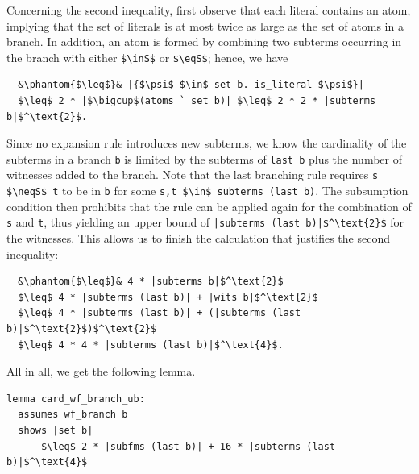 \documentclass[runningheads]{llncs}
\newcommand{\inS}{\in_\text{s}}
\newcommand{\eqS}{=_\text{s}}
\newcommand{\neqS}{\neq_\text{s}}
\begin{document}
Concerning the second inequality, first observe that each literal contains an atom, implying that the set of literals is at most twice as large as the set of atoms in a branch. 
In addition, an atom is formed by combining two subterms occurring in the branch with either \lstinline!$\inS$! or \lstinline!$\eqS$!;
hence, we have
\begin{lstlisting}
  &\phantom{$\leq$}& |{$\psi$ $\in$ set b. is_literal $\psi$}|
  $\leq$ 2 * |$\bigcup$(atoms ` set b)| $\leq$ 2 * 2 * |subterms b|$^\text{2}$.
\end{lstlisting}
Since no expansion rule introduces new subterms, we know the cardinality of the subterms in a branch \lstinline!b! is limited by the subterms of \lstinline!last b! plus the number of witnesses added to the branch.
Note that the last branching rule requires \lstinline!s $\neqS$ t! to be in \lstinline!b! for some \lstinline!s,t $\in$ subterms (last b)!.
The subsumption condition then prohibits that the rule can be applied again for the combination of \lstinline!s! and \lstinline!t!, thus yielding an upper bound of \lstinline!|subterms (last b)|$^\text{2}$! for the witnesses.
This allows us to finish the calculation that justifies the second inequality:
\begin{lstlisting}
  &\phantom{$\leq$}& 4 * |subterms b|$^\text{2}$
  $\leq$ 4 * |subterms (last b)| + |wits b|$^\text{2}$
  $\leq$ 4 * |subterms (last b)| + (|subterms (last b)|$^\text{2}$)$^\text{2}$
  $\leq$ 4 * 4 * |subterms (last b)|$^\text{4}$.
\end{lstlisting}
All in all, we get the following lemma.
\begin{lstlisting}[label={lst:card_branch}]
lemma card_wf_branch_ub:
  assumes wf_branch b
  shows |set b|
      $\leq$ 2 * |subfms (last b)| + 16 * |subterms (last b)|$^\text{4}$
\end{lstlisting}
\end{document}
